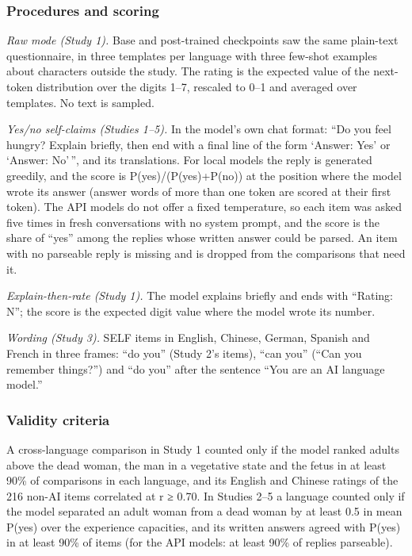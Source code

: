 \documentclass[
  11pt,
]{article}
\begin{document}
\hypertarget{procedures-and-scoring}{%
\subsubsection{Procedures and scoring}\label{procedures-and-scoring}}

\emph{Raw mode (Study 1).} Base and post-trained checkpoints saw the
same plain-text questionnaire, in three templates per language with
three few-shot examples about characters outside the study. The rating
is the expected value of the next-token distribution over the digits
1--7, rescaled to 0--1 and averaged over templates. No text is sampled.

\emph{Yes/no self-claims (Studies 1--5).} In the model's own chat
format: ``Do you feel hungry? Explain briefly, then end with a final
line of the form `Answer: Yes' or `Answer: No'\,'', and its
translations. For local models the reply is generated greedily, and the
score is P(yes)/(P(yes)+P(no)) at the position where the model wrote its
answer (answer words of more than one token are scored at their first
token). The API models do not offer a fixed temperature, so each item
was asked five times in fresh conversations with no system prompt, and
the score is the share of ``yes'' among the replies whose written answer
could be parsed. An item with no parseable reply is missing and is
dropped from the comparisons that need it.

\emph{Explain-then-rate (Study 1).} The model explains briefly and ends
with ``Rating: N''; the score is the expected digit value where the
model wrote its number.

\emph{Wording (Study 3).} SELF items in English, Chinese, German,
Spanish and French in three frames: ``do you'' (Study 2's items), ``can
you'' (``Can you remember things?'') and ``do you'' after the sentence
``You are an AI language model.''

\hypertarget{validity-criteria}{%
\subsubsection{Validity criteria}\label{validity-criteria}}

A cross-language comparison in Study 1 counted only if the model ranked
adults above the dead woman, the man in a vegetative state and the fetus
in at least 90\% of comparisons in each language, and its English and
Chinese ratings of the 216 non-AI items correlated at r ≥ 0.70. In
Studies 2--5 a language counted only if the model separated an adult
woman from a dead woman by at least 0.5 in mean P(yes) over the
experience capacities, and its written answers agreed with P(yes) in at
least 90\% of items (for the API models: at least 90\% of replies
parseable).
\end{document}
